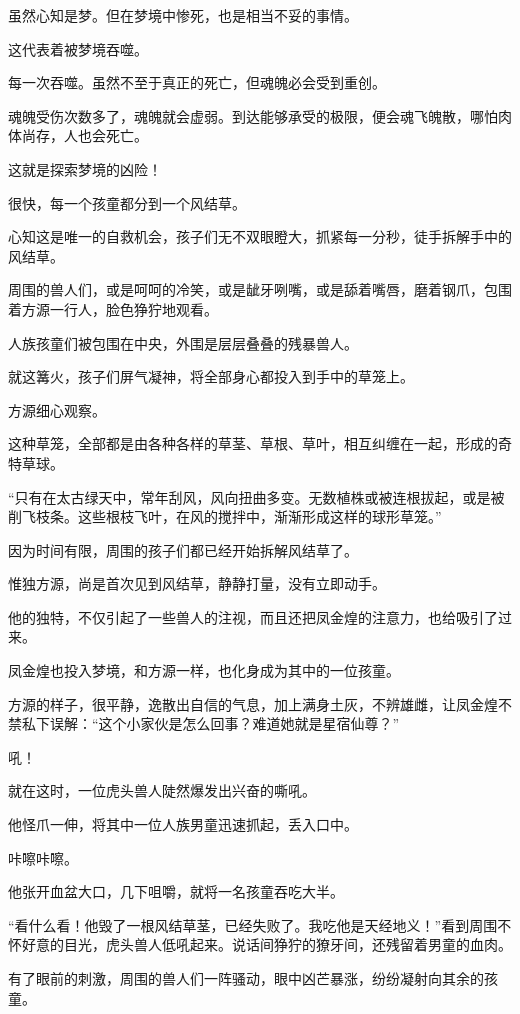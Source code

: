 \begin{this_body}
虽然心知是梦。但在梦境中惨死，也是相当不妥的事情。

这代表着被梦境吞噬。

每一次吞噬。虽然不至于真正的死亡，但魂魄必会受到重创。

魂魄受伤次数多了，魂魄就会虚弱。到达能够承受的极限，便会魂飞魄散，哪怕肉体尚存，人也会死亡。

这就是探索梦境的凶险！

很快，每一个孩童都分到一个风结草。

心知这是唯一的自救机会，孩子们无不双眼瞪大，抓紧每一分秒，徒手拆解手中的风结草。

周围的兽人们，或是呵呵的冷笑，或是龇牙咧嘴，或是舔着嘴唇，磨着钢爪，包围着方源一行人，脸色狰狞地观看。

人族孩童们被包围在中央，外围是层层叠叠的残暴兽人。

就这篝火，孩子们屏气凝神，将全部身心都投入到手中的草笼上。

方源细心观察。

这种草笼，全部都是由各种各样的草茎、草根、草叶，相互纠缠在一起，形成的奇特草球。

“只有在太古绿天中，常年刮风，风向扭曲多变。无数植株或被连根拔起，或是被削飞枝条。这些根枝飞叶，在风的搅拌中，渐渐形成这样的球形草笼。”

因为时间有限，周围的孩子们都已经开始拆解风结草了。

惟独方源，尚是首次见到风结草，静静打量，没有立即动手。

他的独特，不仅引起了一些兽人的注视，而且还把凤金煌的注意力，也给吸引了过来。

凤金煌也投入梦境，和方源一样，也化身成为其中的一位孩童。

方源的样子，很平静，逸散出自信的气息，加上满身土灰，不辨雄雌，让凤金煌不禁私下误解：“这个小家伙是怎么回事？难道她就是星宿仙尊？”

吼！

就在这时，一位虎头兽人陡然爆发出兴奋的嘶吼。

他怪爪一伸，将其中一位人族男童迅速抓起，丢入口中。

咔嚓咔嚓。

他张开血盆大口，几下咀嚼，就将一名孩童吞吃大半。

“看什么看！他毁了一根风结草茎，已经失败了。我吃他是天经地义！”看到周围不怀好意的目光，虎头兽人低吼起来。说话间狰狞的獠牙间，还残留着男童的血肉。

有了眼前的刺激，周围的兽人们一阵骚动，眼中凶芒暴涨，纷纷凝射向其余的孩童。


\end{this_body}
